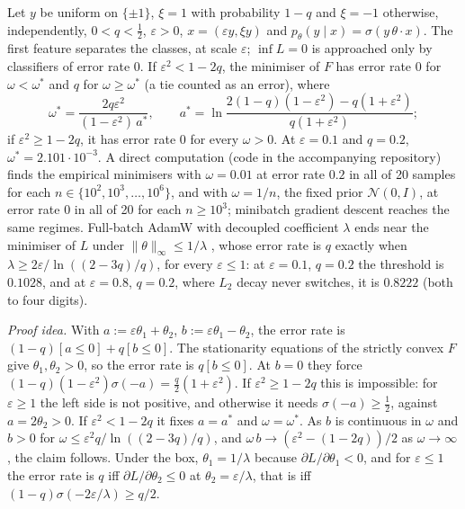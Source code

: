 \begin{example}\label{ex:teacher:weightdecay}
Let $y$ be uniform on $\{\pm1\}$, $\xi=1$ with probability $1-q$ and $\xi=-1$ otherwise, independently, $0<q<\frac12$, $\varepsilon>0$, $x=(\varepsilon y,\xi y)$ and $p_\theta(y\mid x)=\sigma(y\,\theta\cdot x)$. The first feature separates the classes, at scale $\varepsilon$; $\inf L=0$ is approached only by classifiers of error rate $0$. If $\varepsilon^2<1-2q$, the minimiser of $F$ has error rate $0$ for $\omega<\omega^*$ and $q$ for $\omega\ge\omega^*$ (a tie counted as an error), where
\[
\omega^*=\frac{2q\varepsilon^2}{(1-\varepsilon^2)\,a^*},\qquad a^*=\ln\frac{2(1-q)(1-\varepsilon^2)-q(1+\varepsilon^2)}{q(1+\varepsilon^2)};
\]
if $\varepsilon^2\ge1-2q$, it has error rate $0$ for every $\omega>0$. At $\varepsilon=0.1$ and $q=0.2$, $\omega^*=2.101\cdot10^{-3}$. A direct computation (code in the accompanying repository) finds the empirical minimisers with $\omega=0.01$ at error rate $0.2$ in all of 20 samples for each $n\in\{10^2,10^3,\dots,10^6\}$, and with $\omega=1/n$, the fixed prior $\mathcal N(0,I)$, at error rate $0$ in all of 20 for each $n\ge10^3$; minibatch gradient descent reaches the same regimes. Full-batch AdamW with decoupled coefficient $\lambda$ ends near the minimiser of $L$ under $\|\theta\|_\infty\le1/\lambda$ \citep{xie2024implicit}, whose error rate is $q$ exactly when $\lambda\ge2\varepsilon/\ln((2-3q)/q)$, for every $\varepsilon\le1$: at $\varepsilon=0.1$, $q=0.2$ the threshold is $0.1028$, and at $\varepsilon=0.8$, $q=0.2$, where $L_2$ decay never switches, it is $0.8222$ (both to four digits).
\end{example}

\emph{Proof idea.} With $a:=\varepsilon\theta_1+\theta_2$, $b:=\varepsilon\theta_1-\theta_2$, the error rate is $(1-q)[a\le0]+q[b\le0]$. The stationarity equations of the strictly convex $F$ give $\theta_1,\theta_2>0$, so the error rate is $q[b\le0]$. At $b=0$ they force $(1-q)(1-\varepsilon^2)\sigma(-a)=\frac q2(1+\varepsilon^2)$. If $\varepsilon^2\ge1-2q$ this is impossible: for $\varepsilon\ge1$ the left side is not positive, and otherwise it needs $\sigma(-a)\ge\frac12$, against $a=2\theta_2>0$. If $\varepsilon^2<1-2q$ it fixes $a=a^*$ and $\omega=\omega^*$. As $b$ is continuous in $\omega$ and $b>0$ for $\omega\le\varepsilon^2q/\ln((2-3q)/q)$, and $\omega\,b\to(\varepsilon^2-(1-2q))/2$ as $\omega\to\infty$, the claim follows. Under the box, $\theta_1=1/\lambda$ because $\partial L/\partial\theta_1<0$, and for $\varepsilon\le1$ the error rate is $q$ iff $\partial L/\partial\theta_2\le0$ at $\theta_2=\varepsilon/\lambda$, that is iff $(1-q)\sigma(-2\varepsilon/\lambda)\ge q/2$.

